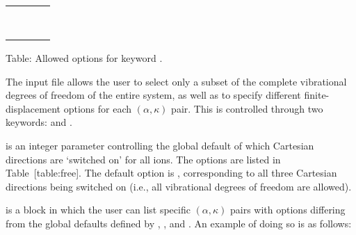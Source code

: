 \documentclass[letterpaper,10pt,english]{sphinxmanual}
\begin{document}
\begin{savenotes}\sphinxattablestart
\centering
\begin{tabulary}{\linewidth}[t]{|T|T|T|T|}
\hline
{}\relax &\relax &\relax &\relax \\
\hline
{}
&
&
&
\\
\hline
{}
&
&
&
\\
\hline
{}
&
&
&
\\
\hline
{}
&
&
&
\\
\hline
{}
&
&
&
\\
\hline
{}
&
&
&
\\
\hline
{}
&
&
&
\\
\hline
{}
&
&
&
\\
\hline
\end{tabulary}
\par
\sphinxattableend\end{savenotes}

Table: Allowed options for keyword .

The input file allows the user to select only a subset of the complete
vibrational degrees of freedom of the entire system, as well as to
specify different finite-displacement options for each
\(\left ( \alpha, \kappa \right )\) pair. This is controlled through
two keywords:  and .

 is an integer parameter controlling the global
default of which Cartesian directions are ‘switched on’ for all ions.
The options are listed in Table {[}table:free{]}. The default option is
, corresponding to all three Cartesian directions being switched on
(i.e., all vibrational degrees of freedom are allowed).

 is a block in which the user can list specific
\(\left ( \alpha, \kappa \right )\) pairs with options differing
from the global defaults defined by ,
, and . An example of doing so
is as follows:
\end{document}
